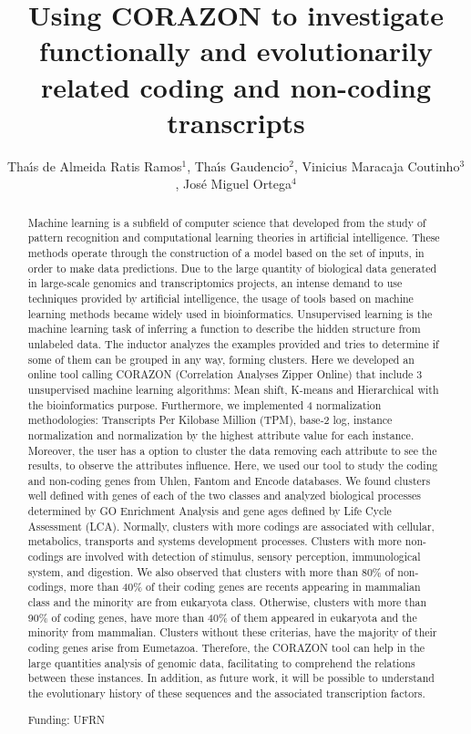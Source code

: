 \documentclass[twoside]{article}
\title{\vspace{-15mm}\fontsize{24pt}{10pt}\selectfont\textbf{Using CORAZON to investigate functionally and evolutionarily related coding and non-coding transcripts}} %
\author{Tha\'{\i}s de Almeida Ratis Ramos$^1$, Tha\'{\i}s Gaudencio$^2$, Vinicius Maracaja Coutinho$^3$, Jos\'e Miguel Ortega$^4$}
\affil{1 UFRN\\ 2 UFPB\\ 3 UNIVERSIDAD MAYOR\\ 4 UFMG. LABORAT\'ORIO DE BIODADOS.\\ }
\date{}
\begin{document}
\maketitle %

\thispagestyle{fancy} %


\begin{abstract}
Machine learning is a subfield of computer science that developed from the study of pattern recognition and computational learning theories in artificial intelligence. These methods operate through the construction of a model based on the set of inputs, in order to make data predictions. Due to the large quantity of biological data generated in large-scale genomics and transcriptomics projects, an intense demand to use techniques provided by artificial intelligence, the usage of tools based on machine learning methods became widely used in bioinformatics. Unsupervised learning is the machine learning task of inferring a function to describe the hidden structure from unlabeled data. The inductor analyzes the examples provided and tries to determine if some of them can be grouped in any way, forming clusters. Here we developed an online tool calling CORAZON (Correlation Analyses Zipper Online) that include 3 unsupervised machine learning algorithms: Mean shift,  K-means and Hierarchical with the bioinformatics purpose. Furthermore, we implemented 4 normalization methodologies: Transcripts Per Kilobase Million (TPM), base-2 log, instance normalization and normalization by the highest attribute value for each instance. Moreover, the user has a option to cluster the data removing each attribute to see the results, to observe the attributes influence.  Here, we used our tool to study the coding and non-coding genes from Uhlen, Fantom and Encode databases. We found clusters well defined with genes of each of the two classes and analyzed biological processes determined by GO Enrichment Analysis and gene ages defined by Life Cycle Assessment (LCA). Normally, clusters with more codings are associated with cellular, metabolics, transports and systems development processes. Clusters with more non-codings are involved with detection of stimulus, sensory perception, immunological system, and digestion. We also observed that clusters with more than 80\% of non-codings, more than 40\% of their coding genes are recents appearing in mammalian class and the minority are from eukaryota class. Otherwise, clusters with more than 90\% of coding genes, have more than 40\% of them appeared in eukaryota and the minority from mammalian. Clusters without these criterias, have the majority of their coding genes arise from Eumetazoa. Therefore, the CORAZON tool can help in the large quantities analysis of genomic data, facilitating to comprehend the relations between these instances. In addition, as future work, it will be possible to understand the evolutionary history of these sequences and the associated transcription factors.

Funding: UFRN
\end{abstract}
\end{document}
